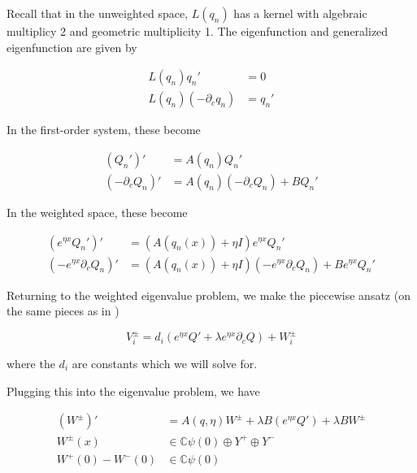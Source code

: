 \documentclass[12pt]{article}
\def\C{{\mathbb C}}
\begin{document}
Recall that in the unweighted space, $L(q_n)$ has a kernel with algebraic multiplicy 2 and geometric multiplicity 1. The eigenfunction and generalized eigenfunction are given by

\begin{align*}
L(q_n) q_n' &= 0 \\
L(q_n) (-\partial_c q_n) &= q_n'
\end{align*}

In the first-order system, these become

\begin{align*}
(Q_n')' &= A(q_n) Q_n' \\
(-\partial_c Q_n)' &= A(q_n) (-\partial_c Q_n) + B Q_n'
\end{align*}

In the weighted space, these become

\begin{align*}
(e^{\eta x} Q_n')' &= (A(q_n(x)) + \eta I) e^{\eta x}  Q_n' \\
(-e^{\eta x} \partial_c Q_n)' &= (A(q_n(x)) + \eta I) (-e^{\eta x} \partial_c Q_n) + B e^{\eta x} Q_n'
\end{align*}

Returning to the weighted eigenvalue problem, we make the piecewise ansatz (on the same pieces as in \cite{Sandstede1998})

\[
V_i^\pm = d_i (e^{\eta x} Q' + \lambda e^{\eta x} \partial_c Q) + W_i^\pm
\]

where the $d_i$ are constants which we will solve for.

Plugging this into the eigenvalue problem, we have

\begin{align*}
(W^\pm)' &= A(q, \eta)W^\pm + \lambda B (e^{\eta x} Q') + \lambda B W^\pm \\
W^\pm(x) &\in \C \psi(0) \oplus Y^+ \oplus Y^- \\
W^+(0) - W^-(0) &\in \C \psi(0) 
\end{align*}


\end{document}
